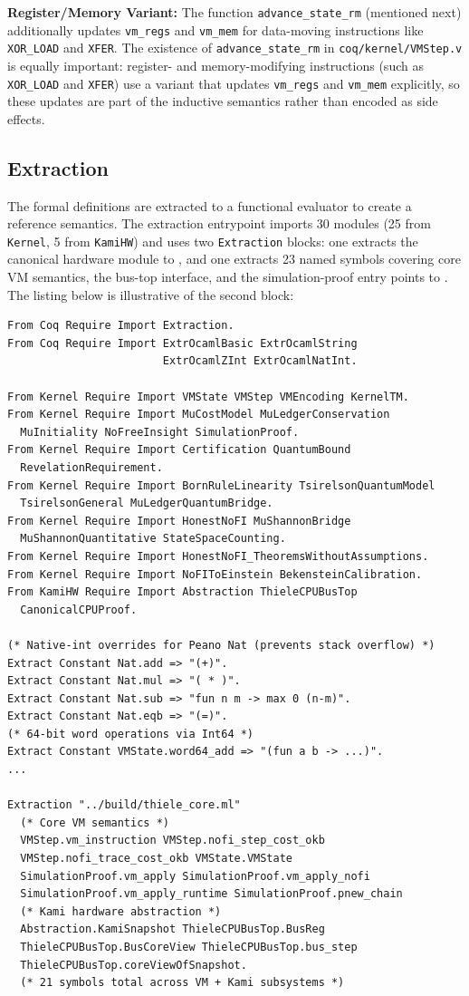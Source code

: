 \textbf{Register/Memory Variant:} The function \texttt{advance\_state\_rm} (mentioned next) additionally updates \texttt{vm\_regs} and \texttt{vm\_mem} for data-moving instructions like \texttt{XOR\_LOAD} and \texttt{XFER}.
The existence of \texttt{advance\_state\_rm} in \texttt{coq/kernel/VMStep.v} is equally important: register- and memory-modifying instructions (such as \texttt{XOR\_LOAD} and \texttt{XFER}) use a variant that updates \texttt{vm\_regs} and \texttt{vm\_mem} explicitly, so these updates are part of the inductive semantics rather than encoded as side effects.

\subsection{Extraction}

The formal definitions are extracted to a functional evaluator to create a reference semantics. The extraction entrypoint  imports 30 modules (25 from \texttt{Kernel}, 5 from \texttt{KamiHW}) and uses two \texttt{Extraction} blocks: one extracts the canonical hardware module to , and one extracts 23 named symbols covering core VM semantics, the bus-top interface, and the simulation-proof entry points to . The listing below is illustrative of the second block:
\begin{lstlisting}
From Coq Require Import Extraction.
From Coq Require Import ExtrOcamlBasic ExtrOcamlString
                        ExtrOcamlZInt ExtrOcamlNatInt.

From Kernel Require Import VMState VMStep VMEncoding KernelTM.
From Kernel Require Import MuCostModel MuLedgerConservation
  MuInitiality NoFreeInsight SimulationProof.
From Kernel Require Import Certification QuantumBound
  RevelationRequirement.
From Kernel Require Import BornRuleLinearity TsirelsonQuantumModel
  TsirelsonGeneral MuLedgerQuantumBridge.
From Kernel Require Import HonestNoFI MuShannonBridge
  MuShannonQuantitative StateSpaceCounting.
From Kernel Require Import HonestNoFI_TheoremsWithoutAssumptions.
From Kernel Require Import NoFIToEinstein BekensteinCalibration.
From KamiHW Require Import Abstraction ThieleCPUBusTop
  CanonicalCPUProof.

(* Native-int overrides for Peano Nat (prevents stack overflow) *)
Extract Constant Nat.add => "(+)".
Extract Constant Nat.mul => "( * )".
Extract Constant Nat.sub => "fun n m -> max 0 (n-m)".
Extract Constant Nat.eqb => "(=)".
(* 64-bit word operations via Int64 *)
Extract Constant VMState.word64_add => "(fun a b -> ...)".
...

Extraction "../build/thiele_core.ml"
  (* Core VM semantics *)
  VMStep.vm_instruction VMStep.nofi_step_cost_okb
  VMStep.nofi_trace_cost_okb VMState.VMState
  SimulationProof.vm_apply SimulationProof.vm_apply_nofi
  SimulationProof.vm_apply_runtime SimulationProof.pnew_chain
  (* Kami hardware abstraction *)
  Abstraction.KamiSnapshot ThieleCPUBusTop.BusReg
  ThieleCPUBusTop.BusCoreView ThieleCPUBusTop.bus_step
  ThieleCPUBusTop.coreViewOfSnapshot.
  (* 21 symbols total across VM + Kami subsystems *)
\end{lstlisting}

